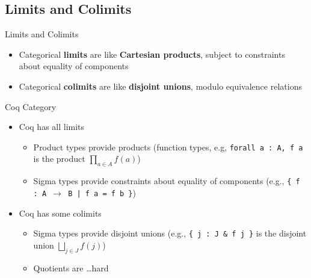 \documentclass[utf8x]{beamer}
\begin{document}
  \subsection{Limits and Colimits}
    \begin{frame}{Limits and Colimits}
      \begin{itemize}
        \item
          Categorical \textbf{limits} are like \textbf{Cartesian products}, subject to constraints about equality of components \pause
        \item
          Categorical \textbf{colimits} are like \textbf{disjoint unions}, modulo equivalence relations
      \end{itemize}
    \end{frame}
    
    \begin{frame}{Coq Category}
      \begin{itemize}
        \item Coq has all limits
          \begin{itemize}
            \item
              Product types provide products (function types, e.g, \texttt{forall~a~:~A,~f~a} is the product $\prod_{a \in A} f(a)$)
            \item
              Sigma types provide constraints about equality of components (e.g., \texttt{\{ f : A $\to$ B | f a = f b \}})
          \end{itemize} \pause
        \item Coq has some colimits
          \begin{itemize}
            \item
              Sigma types provide disjoint unions (e.g., \texttt{\{ j : J \& f j \}} is the disjoint union $\bigsqcup_{j \in J} f(j)$)
            \item
              Quotients are \ldots\space hard
          \end{itemize}
      \end{itemize}
    \end{frame}
    
\end{document}

